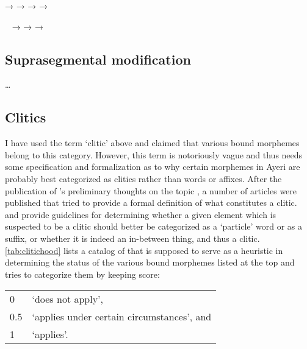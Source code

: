 \pex
	\a {} →  \label{ex:regdim}
	\a {} →  
		\label{ex:otherredupnn}
	\a {} → 
		 \label{ex:otherredupadj}
	\a {} →  
		\label{ex:otherredupvb}
\xe

\pex~\label{ex:adjredup}
	\a {} → 
	\a {} → 
	\a {} → 
\xe

\subsection{Suprasegmental modification}

…

\subsection{Clitics}

I have used the term `clitic' above and claimed that various bound morphemes 
belong to this category. However, this term is notoriously vague and thus needs 
some specification and formalization as to why certain morphemes in Ayeri are 
probably best categorized as clitics rather than words or affixes. After the 
publication of \citeauthor{zwicky1977}'s preliminary thoughts on the topic 
\citep{zwicky1977}, a number of articles were published that tried to provide a 
formal definition of what constitutes a clitic. \citet{zwicky1985} and 
\citet{klavans1985} provide guidelines for determining whether a given element 
which is suspected to be a clitic should better be categorized as a `particle' 
word or as a suffix, or whether it is indeed an in-between thing, and thus a 
clitic. \autoref{tab:clitichood} lists a catalog of 
 that is supposed to serve as a 
heuristic in determining the status of the various bound morphemes listed at 
the top and tries to categorize them by keeping score:

\begin{longtabu} to .75\linewidth {X[1r] X[6l]}
0 & `does not apply',\\
0.5 & `applies under certain circumstances', and\\
1 & `applies'.\\
\end{longtabu}\addtocounter{table}{-1}

